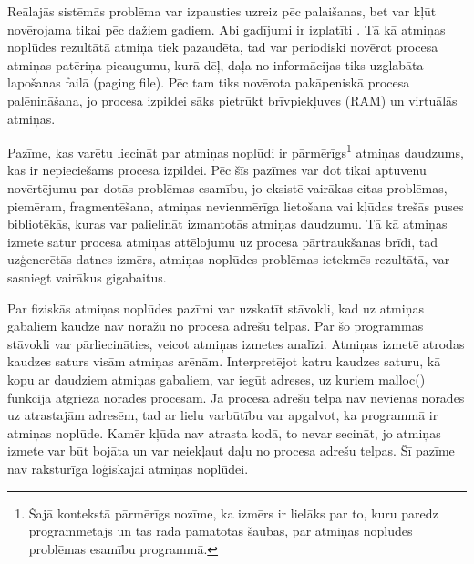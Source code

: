 Reālajās sistēmās problēma var izpausties uzreiz pēc palaišanas, bet var kļūt novērojama tikai pēc dažiem gadiem. Abi gadījumi ir izplatīti \cite{HTTM}.
Tā kā atmiņas noplūdes rezultātā atmiņa tiek pazaudēta, tad var periodiski novērot procesa atmiņas patēriņa pieaugumu, kurā dēļ, daļa no informācijas tiks uzglabāta lapošanas failā (paging file).
Pēc tam tiks novērota pakāpeniskā procesa palēnināšana, jo procesa izpildei sāks pietrūkt brīvpiekļuves (RAM) un virtuālās atmiņas.

Pazīme, kas varētu liecināt par atmiņas noplūdi ir pārmērīgs\footnote{Šajā kontekstā pārmērīgs nozīme, ka izmērs ir lielāks par to, kuru paredz programmētājs un tas rāda pamatotas šaubas, par atmiņas noplūdes problēmas esamību programmā.}
atmiņas daudzums, kas ir nepieciešams procesa izpildei. 
Pēc šīs pazīmes var dot tikai aptuvenu novērtējumu par dotās problēmas esamību, jo eksistē vairākas citas problēmas, piemēram, fragmentēšana, atmiņas nevienmērīga lietošana vai kļūdas trešās puses bibliotēkās, kuras var palielināt izmantotās atmiņas daudzumu.
Tā kā atmiņas izmete satur procesa atmiņas attēlojumu uz procesa pārtraukšanas brīdi, tad uzģenerētās datnes izmērs, atmiņas noplūdes problēmas ietekmēs rezultātā, var sasniegt vairākus gigabaitus.


Par fiziskās atmiņas noplūdes pazīmi var uzskatīt stāvokli, kad uz atmiņas gabaliem kaudzē nav norāžu no procesa adrešu telpas.
Par šo programmas stāvokli var pārliecināties, veicot atmiņas izmetes analīzi. 
Atmiņas izmetē atrodas kaudzes saturs visām atmiņas arēnām. 
Interpretējot katru kaudzes saturu, kā kopu ar daudziem atmiņas gabaliem, var iegūt adreses, uz kuriem malloc() funkcija atgrieza norādes procesam.
Ja procesa adrešu telpā nav nevienas norādes uz atrastajām adresēm, tad ar lielu varbūtību var apgalvot, ka programmā ir atmiņas noplūde.
Kamēr kļūda nav atrasta kodā, to nevar secināt, jo atmiņas izmete var būt bojāta un var neiekļaut daļu no procesa adrešu telpas.
Šī pazīme nav raksturīga loģiskajai atmiņas noplūdei.



